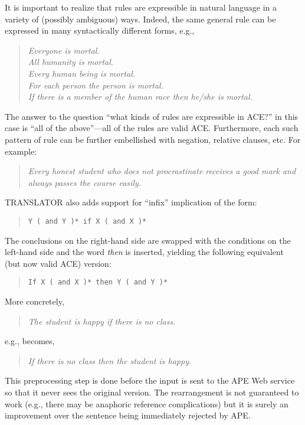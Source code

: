 \documentclass[12pt]{report}
\begin{document}
It is important to realize that rules are expressible in natural language in a variety of (possibly ambiguous) ways. Indeed, the same general rule can be expressed in many syntactically different forms, e.g.,
\begin{quote}
\textit{Everyone is mortal.\\
All humanity is mortal.\\
Every human being is mortal.\\
For each person the person is mortal.\\
If there is a member of the human race then he/she is mortal.}
\end{quote}
The answer to the question ``what kinds of rules are expressible in ACE?'' in this case is ``all of the above''---all of the rules are valid ACE. Furthermore, each such pattern of rule can be further embellished with negation, relative clauses, etc. For example:
\begin{quote}
\textit{Every honest student who does not procrastinate receives a good mark and always passes the course easily.}
\end{quote}
TRANSLATOR also adds support for ``infix'' implication of the form:
\begin{quote}
\texttt{Y ( and Y )* if X ( and X )*}
\end{quote}
The conclusions on the right-hand side are swapped with the conditions on the left-hand side and the word \textit{then} is inserted, yielding the following equivalent (but now valid ACE) version:
\begin{quote}
\texttt{If X ( and X )* then Y ( and Y )*}
\end{quote}
More concretely, 
\begin{quote}
\textit{The student is happy if there is no class.}
\end{quote}
e.g., becomes,
\begin{quote}
\textit{If there is no class then the student is happy.}
\end{quote}
This preprocessing step is done before the input is sent to the APE Web service so that it never sees the original version. The rearrangement is not guaranteed to work (e.g., there may be anaphoric reference complications) but it is surely an improvement over the sentence being immediately rejected by APE.
\end{document}
